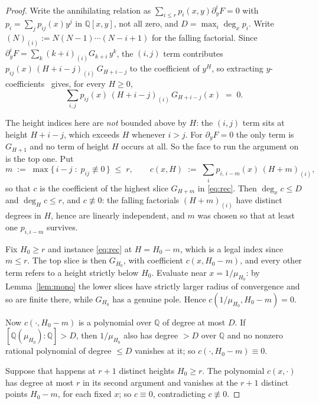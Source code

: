 \documentclass[11pt]{article}
\newcommand{\Q}{\mathbb{Q}}
\begin{document}
\begin{proof}
Write the annihilating relation as $\sum_{i \le r}p_i(x,y)\partial_y^iF = 0$ with
$p_i = \sum_j p_{ij}(x)y^j$ in $\Q[x,y]$, not all zero, and $D = \max_i \deg_x p_i$.
Write $(N)_{(i)} := N(N-1)\cdots(N-i+1)$ for the falling factorial. Since
$\partial_y^iF = \sum_k (k+i)_{(i)}G_{k+i}\,y^k$, the $(i,j)$ term
contributes $p_{ij}(x)\,(H+i-j)_{(i)}\,G_{H+i-j}$ to the coefficient of $y^H$, so
extracting $y$-coefficients~\cite[Lemma~9]{bmr2002} gives, for every $H \ge 0$,
\begin{equation}
  \sum_{i,j} p_{ij}(x)\,(H+i-j)_{(i)}\,G_{H+i-j}(x) \;=\; 0 .
  \label{eq:rec}
\end{equation}

The height indices here are \emph{not} bounded above by $H$: the $(i,j)$ term
sits at height $H + i - j$, which exceeds $H$ whenever $i > j$. For
$\partial_yF = 0$ the only term is $G_{H+1}$ and no term of height $H$ occurs at
all. So the face to run the argument on is the top one. Put
\[
  m \;:=\; \max\{\,i - j \;:\; p_{ij} \not\equiv 0\,\} \;\le\; r,
  \qquad
  c(x,H) \;:=\; \sum_{i} p_{i,\,i-m}(x)\,(H+m)_{(i)} ,
\]
so that $c$ is the coefficient of the highest slice $G_{H+m}$ in
\eqref{eq:rec}. Then $\deg_x c \le D$ and $\deg_H c \le r$, and
$c \not\equiv 0$: the falling factorials $(H+m)_{(i)}$ have distinct degrees in
$H$, hence are linearly independent, and $m$ was chosen so that at least one
$p_{i,i-m}$ survives.

Fix $H_0 \ge r$ and instance \eqref{eq:rec} at $H = H_0 - m$, which is a legal
index since $m \le r$. The top slice is then $G_{H_0}$, with coefficient
$c(x,H_0-m)$, and every other term refers to a height strictly below $H_0$.
Evaluate near $x = 1/\mu_{H_0}$: by Lemma~\ref{lem:mono} the lower slices have
strictly larger radius of convergence and so are finite there, while $G_{H_0}$
has a genuine pole. Hence $c(1/\mu_{H_0},H_0-m) = 0$.

Now $c(\cdot,H_0-m)$ is a polynomial over $\Q$ of degree at most $D$. If
$[\Q(\mu_{H_0}):\Q] > D$, then $1/\mu_{H_0}$ also has degree $> D$ over $\Q$ and
no nonzero rational polynomial of degree $\le D$ vanishes at it; so
$c(\cdot,H_0-m) \equiv 0$.

Suppose that happens at $r+1$ distinct heights $H_0 \ge r$. The polynomial
$c(x,\cdot)$ has degree at most $r$ in its second argument and vanishes at the
$r+1$ distinct points $H_0 - m$, for each fixed $x$; so $c \equiv 0$,
contradicting $c \not\equiv 0$.
\end{proof}
\end{document}
